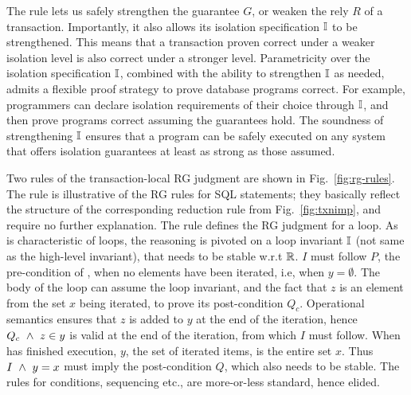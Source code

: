 The  rule lets us safely strengthen the guarantee
$G$, or weaken the rely $R$ of a transaction. Importantly, it also
allows its isolation specification $\mathbb{I}$ to be strengthened. This means
that a transaction proven correct under a weaker isolation level is
also correct under a stronger level. Parametricity over the isolation
specification $\mathbb{I}$, combined with the ability to strengthen $\mathbb{I}$ as
needed, admits a flexible proof strategy to prove database programs
correct. For example, programmers can declare isolation requirements
of their choice through $\mathbb{I}$, and then prove programs correct assuming
the guarantees hold. The soundness of strengthening $\mathbb{I}$ ensures that
a program can be safely executed on any system that offers isolation
guarantees at least as strong as those assumed.

Two rules of the transaction-local RG judgment are shown in
Fig.~\ref{fig:rg-rules}. The rule  is
illustrative of the RG rules for SQL statements; they basically
reflect the structure of the corresponding reduction rule from
Fig.~\ref{fig:txnimp}, and require no further explanation. The rule
 defines the RG judgment for a  loop.
As is characteristic of loops, the reasoning is pivoted on a loop
invariant $\mathbb{I}$ (not same as the high-level invariant), that needs to
be stable w.r.t $\mathbb{R}$. $I$ must follow $P$, the pre-condition of
, when no elements have been iterated, i.e, when
$y=\emptyset$. The body of the loop can assume the loop invariant, and
the fact that $z$ is an element from the set $x$ being iterated, to
prove its post-condition $Q_c$. Operational semantics ensures that $z$
is added to $y$ at the end of the iteration, hence $Q_c ~\wedge~ z\in y$
is valid at the end of the iteration, from which $I$ must follow. When
 has finished execution, $y$, the set of iterated items, is
the entire set $x$. Thus $I ~\wedge~ y=x$ must imply the post-condition
$Q$, which also needs to be stable. The rules for conditions,
sequencing etc., are more-or-less standard, hence elided.



